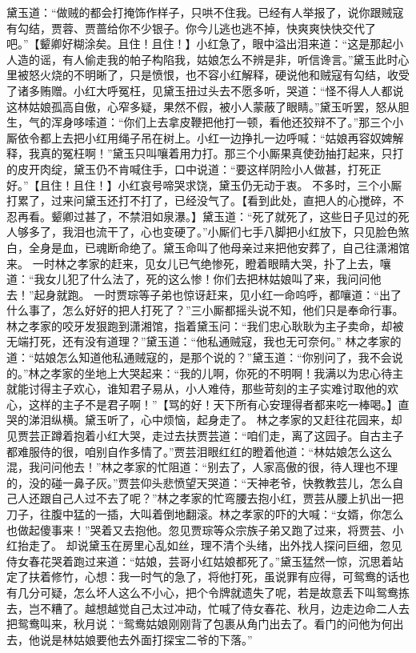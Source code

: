 \documentclass[12pt,oneside]{book}
\begin{document}
黛玉道：“做贼的都会打掩饰作样子，只哄不住我。已经有人举报了，说你跟贼寇有勾结，贾蓉、贾蔷给你不少银子。你今儿逃也逃不掉，快爽爽快快交代了吧。”【颦卿好糊涂矣。且住！且住！】小红急了，眼中溢出泪来道：“这是那起小人造的谣，有人偷走我的帕子构陷我，姑娘怎么不辨是非，听信谗言。”黛玉此时心里被怒火烧的不明晰了，只是愤恨，也不容小红解释，硬说他和贼寇有勾结，收受了诸多贿赠。小红大呼冤枉，见黛玉扭过头去不愿多听，哭道：“怪不得人人都说这林姑娘孤高自傲，心窄多疑，果然不假，被小人蒙蔽了眼睛。”黛玉听罢，怒从胆生，气的浑身哆嗦道：“你们上去拿皮鞭把他打一顿，看他还狡辩不了。”那三个小厮依令都上去把小红用绳子吊在树上。小红一边挣扎一边呼喊：“姑娘再容奴婢解释，我真的冤枉啊！”黛玉只叫嚷着用力打。那三个小厮果真使劲抽打起来，只打的皮开肉绽，黛玉仍不肯喊住手，口中说道：“要这样阴险小人做甚，打死正好。”【且住！且住！】小红哀号啼哭求饶，黛玉仍无动于衷。
不多时，三个小厮打累了，过来问黛玉还打不打了，已经没气了。【看到此处，直把人的心搅碎，不忍再看。颦卿过甚了，不禁泪如泉瀑。】黛玉道：“死了就死了，这些日子见过的死人够多了，我泪也流干了，心也变硬了。”小厮们七手八脚把小红放下，只见脸色煞白，全身是血，已魂断命绝了。黛玉命叫了他母亲过来把他安葬了，自己往潇湘馆来。
一时林之孝家的赶来，见女儿已气绝惨死，瞪着眼睛大哭，扑了上去，嚷道：“我女儿犯了什么法了，死的这么惨！你们去把林姑娘叫了来，我问问他去！”起身就跑。
一时贾琮等子弟也惊讶赶来，见小红一命呜呼，都嚷道：“出了什么事了，怎么好好的把人打死了？”三小厮都摇头说不知，他们只是奉命行事。林之孝家的咬牙发狠跑到潇湘馆，指着黛玉问：“我们忠心耿耿为主子卖命，却被无端打死，还有没有道理？”黛玉道：“他私通贼寇，我也无可奈何。”
林之孝家的道：“姑娘怎么知道他私通贼寇的，是那个说的？”黛玉道：“你别问了，我不会说的。”林之孝家的坐地上大哭起来：“我的儿啊，你死的不明啊！我满以为忠心待主就能讨得主子欢心，谁知君子易从，小人难侍，那些苛刻的主子实难讨取他的欢心，这样的主子不是君子啊！”【骂的好！天下所有心安理得者都来吃一棒喝。】直哭的涕泪纵横。黛玉听了，心中烦恼，起身走了。
林之孝家的又赶往花园来，却见贾芸正蹲着抱着小红大哭，走过去扶贾芸道：“咱们走，离了这园子。自古主子都难服侍的很，咱别自作多情了。”贾芸泪眼红红的瞪着他道：“林姑娘怎么这么混，我问问他去！”林之孝家的忙阻道：“别去了，人家高傲的很，待人理也不理的，没的碰一鼻子灰。”贾芸仰头悲愤望天哭道：“天神老爷，快教教芸儿，怎么自己人还跟自己人过不去了呢？”林之孝家的忙弯腰去抱小红，贾芸从腰上扒出一把刀子，往腹中猛的一插，大叫着倒地翻滚。林之孝家的吓的大喊：“女婿，你怎么也做起傻事来！”哭着又去抱他。忽见贾琮等众宗族子弟又跑了过来，将贾芸、小红抬走了。
却说黛玉在房里心乱如丝，理不清个头绪，出外找人探问巨细，忽见侍女春花哭着跑过来道：“姑娘，芸哥小红姑娘都死了。”黛玉猛然一惊，沉思着站定了扶着修竹，心想：我一时气的急了，将他打死，虽说罪有应得，可鸳鸯的话也有几分可疑，怎么坏人这么不小心，把个令牌就遗失了呢，若是故意丢下叫鸳鸯拣去，岂不糟了。越想越觉自己太过冲动，忙喊了侍女春花、秋月，边走边命二人去把鸳鸯叫来，秋月说：“鸳鸯姑娘刚刚背了包裹从角门出去了。看门的问他为何出去，他说是林姑娘要他去外面打探宝二爷的下落。”
\end{document}
